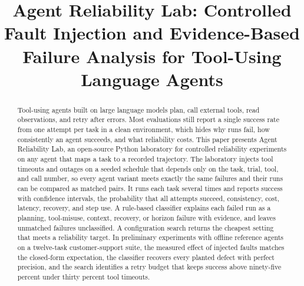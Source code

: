 \documentclass[conference,a4paper]{IEEEtran}
\begin{document}
\title{Agent Reliability Lab: Controlled Fault Injection and Evidence-Based Failure Analysis for Tool-Using Language Agents}

\author{
\and
{}
\and
{}
}

\maketitle

\begin{abstract}
Tool-using agents built on large language models plan, call external tools, read
observations, and retry after errors. Most evaluations still report a single success
rate from one attempt per task in a clean environment, which hides why runs fail, how
consistently an agent succeeds, and what reliability costs. This paper presents Agent
Reliability Lab, an open-source Python laboratory for controlled reliability
experiments on any agent that maps a task to a recorded trajectory. The laboratory
injects tool timeouts and outages on a seeded schedule that depends only on the task,
trial, tool, and call number, so every agent variant meets exactly the same failures and
their runs can be compared as matched pairs. It runs each task several times and
reports success with confidence intervals, the probability that all attempts succeed,
consistency, cost, latency, recovery, and step use. A rule-based classifier explains
each failed run as a planning, tool-misuse, context, recovery, or horizon failure with
evidence, and leaves unmatched failures unclassified. A configuration search returns the
cheapest setting that meets a reliability target. In preliminary experiments with
offline reference agents on a twelve-task customer-support suite, the measured effect of
injected faults matches the closed-form expectation, the classifier recovers every
planted defect with perfect precision, and the search identifies a retry budget that
keeps success above ninety-five percent under thirty percent tool timeouts.
\end{abstract}
\end{document}
